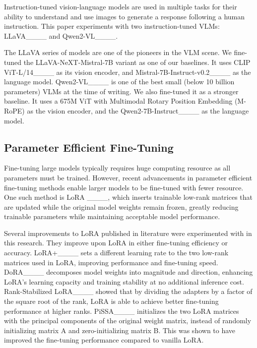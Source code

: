 \par
Instruction-tuned vision-language models are used in multiple tasks for their ability to understand and use images to generate a response following a human instruction. This paper experiments with two instruction-tuned VLMs: LLaVA____ and Qwen2-VL____.
\\
\par
The LLaVA series of models are one of the pioneers in the VLM scene. We fine-tuned the LLaVA-NeXT-Mistral-7B variant as one of our baselines. It uses CLIP ViT-L/14____ as its vision encoder, and Mistral-7B-Instruct-v0.2____ as the language model. Qwen2-VL____ is one of the best small (below 10 billion parameters) VLMs at the time of writing. We also fine-tuned it as a stronger baseline. It uses a 675M ViT with Multimodal Rotary Position Embedding (M-RoPE) as the vision encoder, and the Qwen2-7B-Instruct____ as the language model.

\subsection{Parameter Efficient Fine-Tuning}
Fine-tuning large models typically requires huge computing resource as all parameters must be trained. However, recent advancements in parameter efficient fine-tuning methods enable larger models to be fine-tuned with fewer resource. One such method is LoRA ____, which inserts trainable low-rank matrices that are updated while the original model weights remain frozen, greatly reducing trainable parameters while maintaining acceptable model performance.
\\
\par
Several improvements to LoRA published in literature were experimented with in this research. They improve upon LoRA in either fine-tuning efficiency or accuracy. LoRA+____ sets a different learning rate to the two low-rank matrices used in LoRA, improving performance and fine-tuning speed. DoRA____ decomposes model weights into magnitude and direction, enhancing LoRA's learning capacity and training stability at no additional inference cost. Rank-Stabilized LoRA____ showed that by dividing the adapters by a factor of the square root of the rank, LoRA is able to achieve better fine-tuning performance at higher ranks. PiSSA____ initializes the two LoRA matrices with the principal components of the original weight matrix, instead of randomly initializing matrix A and zero-initializing matrix B. This was shown to have improved the fine-tuning performance compared to vanilla LoRA.